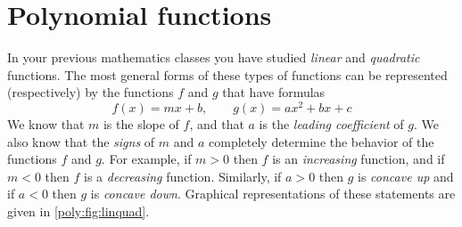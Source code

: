 %
%

\section{Polynomial functions}
 In your previous mathematics classes you have studied \emph{linear} and
 \emph{quadratic} functions. The most general forms of these types of
 functions can be represented (respectively) by  the functions $f$
 and $g$ that have formulas
 \begin{equation}\label{poly:eq:linquad}
	 f(x)=mx+b, \qquad g(x)=ax^2+bx+c
 \end{equation}
 We know that $m$ is the slope of $f$, and that $a$ is the \emph{leading coefficient}
 of $g$. We also know that the \emph{signs} of $m$ and $a$ completely
 determine the behavior of the functions $f$ and $g$. For example, if $m>0$
 then $f$ is an \emph{increasing} function, and if $m<0$ then $f$ is
 a \emph{decreasing} function.  Similarly, if $a>0$ then $g$ is
 \emph{concave up} and if $a<0$ then $g$ is \emph{concave down}. Graphical
 representations of these statements are given in \cref{poly:fig:linquad}.

